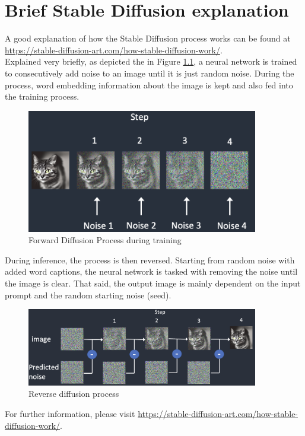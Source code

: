 \documentclass[
  a4paper,  %
  twoside,  %
  bibliography=totoc,
  headsepline,
  cleardoublepage=empty,
  parskip=half,
  draft=false
]{scrbook}
\begin{document}
\chapter{Brief Stable Diffusion explanation}
\label{app:diff-workflow}
A good explanation of how the Stable Diffusion process works can be found at \url{https://stable-diffusion-art.com/how-stable-diffusion-work/}. \\
Explained very briefly, as depicted the in Figure \ref{fig:forward-diff}, a neural network is trained to consecutively add noise to an image until it is just random noise. During the process, word embedding information about the image is kept and also fed into the training process.
\begin{figure}[h]
  \centering
  \includegraphics[width=0.9\textwidth]{./graphics/forward-diff.png}
  \caption{Forward Diffusion Process during training \cite{andrewHowDoesStable2022}}
  \label{fig:forward-diff}
\end{figure}

During inference, the process is then reversed. Starting from random noise with added word captions, the neural network is tasked with removing the noise until the image is clear. That said, the output image is mainly dependent on the input prompt and the random starting noise (seed).

\begin{figure}[h]
  \centering
  \includegraphics[width=0.9\textwidth]{./graphics/reverse-diff.png}
  \caption{Reverse diffusion process \cite{andrewHowDoesStable2022}}
  \label{fig:backward-diff}
\end{figure}

For further information, please visit \url{https://stable-diffusion-art.com/how-stable-diffusion-work/}.

% 

\pagestyle{empty}
\renewcommand*{\chapterpagestyle}{empty}
\Affirmation
\end{document}
